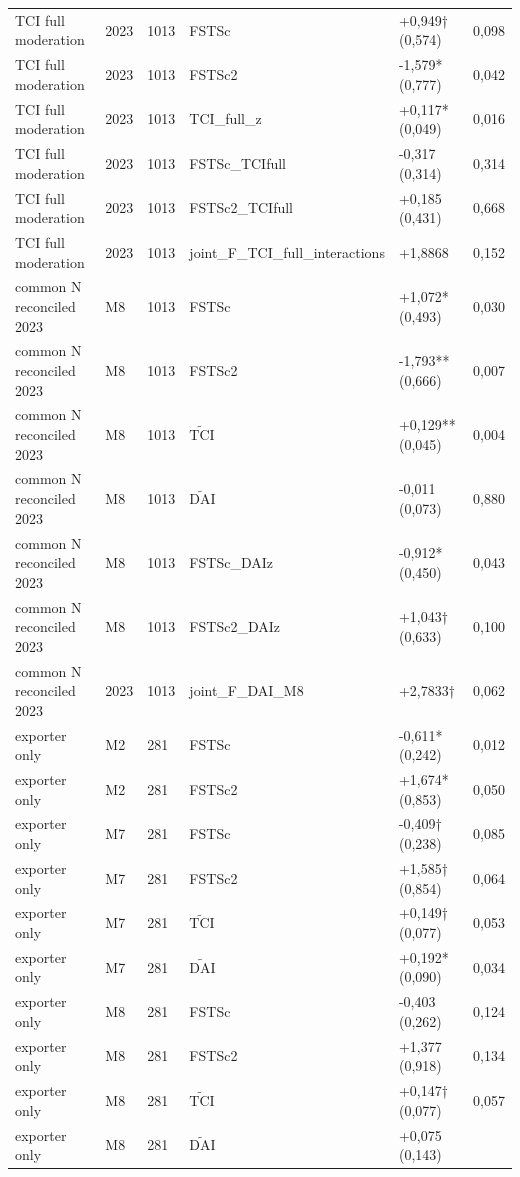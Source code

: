 \documentclass[12pt,a4paper]{article}
\begin{document}
\begin{longtable}[]{@{}llllll@{}}
TCI full moderation & 2023 & 1013 & FSTSc & +0,949† (0,574) & 0,098 \\
TCI full moderation & 2023 & 1013 & FSTSc2 & -1,579* (0,777) & 0,042 \\
TCI full moderation & 2023 & 1013 & TCI\_full\_z & +0,117* (0,049) &
0,016 \\
TCI full moderation & 2023 & 1013 & FSTSc\_TCIfull & -0,317 (0,314) &
0,314 \\
TCI full moderation & 2023 & 1013 & FSTSc2\_TCIfull & +0,185 (0,431) &
0,668 \\
TCI full moderation & 2023 & 1013 & joint\_F\_TCI\_full\_interactions &
+1,8868 & 0,152 \\
common N reconciled 2023 & M8 & 1013 & FSTSc & +1,072* (0,493) &
0,030 \\
common N reconciled 2023 & M8 & 1013 & FSTSc2 & -1,793** (0,666) &
0,007 \\
common N reconciled 2023 & M8 & 1013 & \(\tilde{\mathrm{TCI}}\) &
+0,129** (0,045) & 0,004 \\
common N reconciled 2023 & M8 & 1013 & \(\tilde{\mathrm{DAI}}\) & -0,011
(0,073) & 0,880 \\
common N reconciled 2023 & M8 & 1013 & FSTSc\_DAIz & -0,912* (0,450) &
0,043 \\
common N reconciled 2023 & M8 & 1013 & FSTSc2\_DAIz & +1,043† (0,633) &
0,100 \\
common N reconciled 2023 & 2023 & 1013 & joint\_F\_DAI\_M8 & +2,7833† &
0,062 \\
exporter only & M2 & 281 & FSTSc & -0,611* (0,242) & 0,012 \\
exporter only & M2 & 281 & FSTSc2 & +1,674* (0,853) & 0,050 \\
exporter only & M7 & 281 & FSTSc & -0,409† (0,238) & 0,085 \\
exporter only & M7 & 281 & FSTSc2 & +1,585† (0,854) & 0,064 \\
exporter only & M7 & 281 & \(\tilde{\mathrm{TCI}}\) & +0,149† (0,077) &
0,053 \\
exporter only & M7 & 281 & \(\tilde{\mathrm{DAI}}\) & +0,192* (0,090) &
0,034 \\
exporter only & M8 & 281 & FSTSc & -0,403 (0,262) & 0,124 \\
exporter only & M8 & 281 & FSTSc2 & +1,377 (0,918) & 0,134 \\
exporter only & M8 & 281 & \(\tilde{\mathrm{TCI}}\) & +0,147† (0,077) &
0,057 \\
exporter only & M8 & 281 & \(\tilde{\mathrm{DAI}}\) & +0,075 (0,143) &

\end{longtable}
\end{document}
